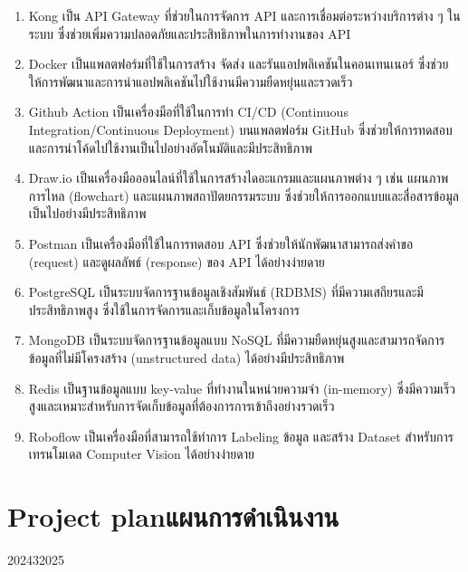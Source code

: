\begin{enumerate}
    \item Kong เป็น API Gateway ที่ช่วยในการจัดการ API และการเชื่อมต่อระหว่างบริการต่าง ๆ ในระบบ ซึ่งช่วยเพิ่มความปลอดภัยและประสิทธิภาพในการทำงานของ API

    \item Docker เป็นแพลตฟอร์มที่ใช้ในการสร้าง จัดส่ง และรันแอปพลิเคชันในคอนเทนเนอร์ ซึ่งช่วยให้การพัฒนาและการนำแอปพลิเคชันไปใช้งานมีความยืดหยุ่นและรวดเร็ว

    \item Github Action เป็นเครื่องมือที่ใช้ในการทำ CI/CD (Continuous Integration/Continuous Deployment) บนแพลตฟอร์ม GitHub ซึ่งช่วยให้การทดสอบและการนำโค้ดไปใช้งานเป็นไปอย่างอัตโนมัติและมีประสิทธิภาพ

    \item Draw.io เป็นเครื่องมือออนไลน์ที่ใช้ในการสร้างไดอะแกรมและแผนภาพต่าง ๆ เช่น แผนภาพการไหล (flowchart) และแผนภาพสถาปัตยกรรมระบบ ซึ่งช่วยให้การออกแบบและสื่อสารข้อมูลเป็นไปอย่างมีประสิทธิภาพ

    \item Postman เป็นเครื่องมือที่ใช้ในการทดสอบ API ซึ่งช่วยให้นักพัฒนาสามารถส่งคำขอ (request) และดูผลลัพธ์ (response) ของ API ได้อย่างง่ายดาย

    \item PostgreSQL เป็นระบบจัดการฐานข้อมูลเชิงสัมพันธ์ (RDBMS) ที่มีความเสถียรและมีประสิทธิภาพสูง ซึ่งใช้ในการจัดการและเก็บข้อมูลในโครงการ

    \item MongoDB เป็นระบบจัดการฐานข้อมูลแบบ NoSQL ที่มีความยืดหยุ่นสูงและสามารถจัดการข้อมูลที่ไม่มีโครงสร้าง (unstructured data) ได้อย่างมีประสิทธิภาพ

    \item Redis เป็นฐานข้อมูลแบบ key-value ที่ทำงานในหน่วยความจำ (in-memory) ซึ่งมีความเร็วสูงและเหมาะสำหรับการจัดเก็บข้อมูลที่ต้องการการเข้าถึงอย่างรวดเร็ว

    \item Roboflow เป็นเครื่องมือที่สามารถใช้ทำการ Labeling ข้อมูล และสร้าง Dataset สำหรับการเทรนโมเดล Computer Vision ได้อย่างง่ายดาย
\end{enumerate}

\section{\ifenglish Project plan\else แผนการดำเนินงาน\fi}

\begin{plan}{10}{2024}{3}{2025}
\end{plan}

